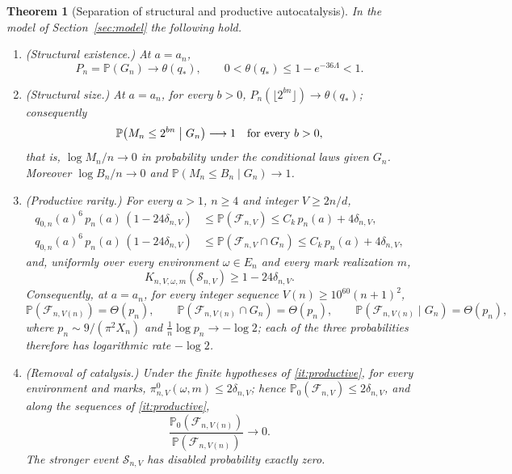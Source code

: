 \documentclass[11pt,letterpaper]{article}
\theoremstyle{plain}
\newtheorem{theorem}{Theorem}[section]
\theoremstyle{definition}
\theoremstyle{remark}
\numberwithin{equation}{section}
\newcommand{\PP}{\mathbb P}
\newcommand{\cF}{\mathcal F}
\newcommand{\cS}{\mathcal S}
\newcommand{\thetaq}{\theta(q_*)}
\begin{document}
\begin{theorem}[Separation of structural and productive autocatalysis]\label{thm:main}
In the model of Section~\ref{sec:model} the following hold.
\begin{enumerate}[label=\textup{(\roman*)},leftmargin=2.2em]
\item\label{it:exist} \textup{(Structural existence.)} At $a=a_n$,
\begin{equation}\label{eq:existence}
 P_n=\PP(G_n)\longrightarrow\thetaq,\qquad 0<\thetaq\le1-e^{-36\Lambda}<1 .
\end{equation}
\item\label{it:size} \textup{(Structural size.)} At $a=a_n$, for every $b>0$, $P_n(\lfloor2^{bn}\rfloor)\to\thetaq$; consequently
\begin{equation}\label{eq:size}
 \PP\bigl(M_n\le2^{bn}\bigm|G_n\bigr)\longrightarrow1\quad\text{for every }b>0,
\end{equation}
that is, $\log M_n/n\to0$ in probability under the conditional laws given $G_n$. Moreover $\log B_n/n\to0$ and $\PP(M_n\le B_n\mid G_n)\to1$.
\item\label{it:productive} \textup{(Productive rarity.)} For every $a>1$, $n\ge4$ and integer $V\ge2n/d$,
\begin{align}
 q_{0,n}(a)^6\,p_n(a)\,(1-24\delta_{n,V})&\le\PP(\cF_{n,V})\le C_k\,p_n(a)+4\delta_{n,V},\label{eq:sandwich}\\
 q_{0,n}(a)^6\,p_n(a)\,(1-24\delta_{n,V})&\le\PP(\cF_{n,V}\cap G_n)\le C_k\,p_n(a)+4\delta_{n,V},\label{eq:jointsandwich}
\end{align}
and, uniformly over every environment $\omega\in E_n$ and every mark realization $m$,
\begin{equation}\label{eq:conditional}
 K_{n,V,\omega,m}(\cS_{n,V})\ge1-24\delta_{n,V}.
\end{equation}
Consequently, at $a=a_n$, for every integer sequence $V(n)\ge10^{60}(n+1)^2$,
\begin{equation}\label{eq:theta-law}
 \PP(\cF_{n,V(n)})=\Theta(p_n),\qquad \PP(\cF_{n,V(n)}\cap G_n)=\Theta(p_n),\qquad
 \PP(\cF_{n,V(n)}\mid G_n)=\Theta(p_n),
\end{equation}
where $p_n\sim9/(\pi^2X_n)$ and $\frac1n\log p_n\to-\log2$; each of the three probabilities therefore has logarithmic rate $-\log2$.
\item\label{it:disabled} \textup{(Removal of catalysis.)} Under the finite hypotheses of \ref{it:productive}, for every environment and marks, $\pi^0_{n,V}(\omega,m)\le2\delta_{n,V}$; hence $\PP_0(\cF_{n,V})\le2\delta_{n,V}$, and along the sequences of \ref{it:productive},
\begin{equation}\label{eq:ratio}
 \frac{\PP_0(\cF_{n,V(n)})}{\PP(\cF_{n,V(n)})}\longrightarrow0 .
\end{equation}
The stronger event $\cS_{n,V}$ has disabled probability exactly zero.
\end{enumerate}
\end{theorem}
\end{document}
